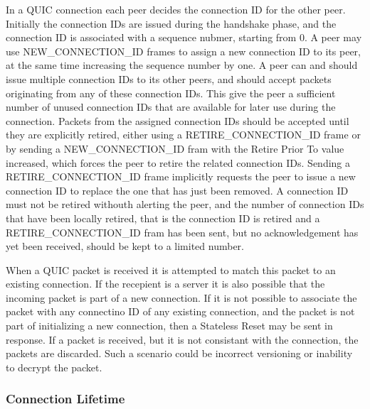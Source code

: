 \documentclass[english, 12pt, a4paper, elec, utf8, a-2b, online]{aaltothesis}
\begin{document}
In a QUIC connection each peer decides the connection ID for the other peer. Initially
the connection IDs are issued during the handshake phase, and the connection ID is
associated with a sequence nubmer, starting from 0. A peer may use NEW\_CONNECTION\_ID frames
to assign a new connection ID to its peer, at the same time increasing the sequence
number by one. A peer can and should issue multiple connection IDs to its other peers,
and should accept packets originating from any of these connection IDs. This give the peer
a sufficient number of unused connection IDs that are available for later use during
the connection. Packets from the assigned connection IDs should be accepted until
they are explicitly retired, either using a RETIRE\_CONNECTION\_ID frame or by
sending a NEW\_CONNECTION\_ID fram with the Retire Prior To value increased, which
forces the peer to retire the related connection IDs. Sending a RETIRE\_CONNECTION\_ID
frame implicitly requests the peer to issue a new connection ID to replace the one
that has just been removed. A connection ID must not be retired withouth alerting the peer,
and the number of connection IDs that have been locally retired, that is the connection
ID is retired and a RETIRE\_CONNECTION\_ID fram has been sent, but no acknowledgement
has yet been received, should be kept to a limited number\cite{rfc9000}.

When a QUIC packet is received it is attempted to match this packet to an existing
connection. If the recepient is a server it is also possible that the incoming
packet is part of a new connection. If it is not possible to associate the packet
with any connectino ID of any existing connection, and the packet is not part of
initializing a new connection, then a Stateless Reset may be sent in response. If
a packet is received, but it is not consistant with the connection, the packets
are discarded. Such a scenario could be incorrect versioning or inability to
decrypt the packet\cite{rfc9000}.

\subsubsection{Connection Lifetime}
\end{document}
